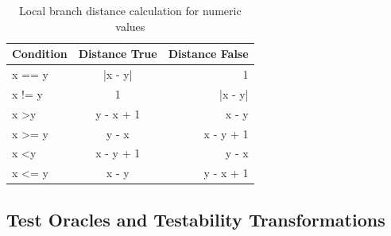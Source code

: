 \documentclass[paper=a4,%
  twoside,%
  BCOR4mm,%
  abstract=true,%
  toc=bibliography,%
  chapterprefix=true,%
  toc=bibliographynumbered,%
  open=right,%
  english,%
  pagesize=pdftex]{scrreprt}
\begin{document}

\begin{table}[]
\centering
\begin{tabular}{lcr}
\hline
\textbf{Condition}  & \textbf{Distance True} & \textbf{Distance False} \\
\hline
x == y              & |x - y|                & 1                       \\
x != y              & 1                      & |x - y|                 \\
x \textgreater y    & y - x + 1              & x - y                   \\
x \textgreater{}= y & y - x                  & x - y + 1               \\
x \textless y       & x - y + 1              & y - x                   \\
x \textless{}= y    & x - y                  & y - x + 1               \\ \hline
\end{tabular}
\caption{Local branch distance calculation for numeric values}
\label{tab:local-branch-distance-formulas}
\end{table}

\subsection{Test Oracles and Testability Transformations}
\label{sec:testability-transformations}
\end{document}

